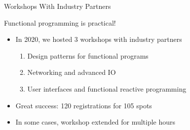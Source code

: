 \documentclass[aspectratio=169]{beamer}
\begin{document}
\begin{frame}{Workshops With Industry Partners}
\vspace{\baselineskip}

\centerline{\Large{\alert{Functional programming is practical!}}}
\pause
\begin{itemize}
\item In 2020, we hosted 3 workshops with industry partners
\begin{enumerate}[<3->]
  \item Design patterns for functional programs
  \item Networking and advanced IO
  \item User interfaces and functional reactive programming
\end{enumerate}
\item<4-> Great success: 120 registrations for 105 spots
\item<5-> In some cases, workshop extended for multiple hours
\end{itemize}
\end{frame}

\end{document}
